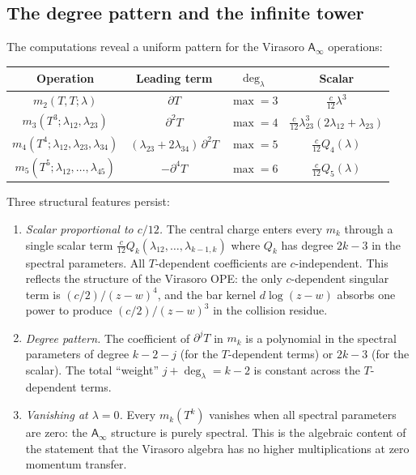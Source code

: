 \documentclass[11pt]{article}
\newcommand{\Ainf}{\mathsf{A}_{\infty}}
\begin{document}
\subsection{The degree pattern and the infinite tower}

The computations reveal a uniform pattern for the Virasoro
$\Ainf$ operations:

\begin{center}
\small
\renewcommand{\arraystretch}{1.3}
\begin{tabular}{@{}cccc@{}}
\textbf{Operation}
  & \textbf{Leading term}
  & \textbf{$\deg_\lambda$}
  & \textbf{Scalar} \\
\hline
$m_2(T,T;\lambda)$
  & $\partial T$
  & $\max = 3$
  & $\frac{c}{12}\lambda^3$ \\[3pt]
$m_3(T^3;\lambda_{12},\lambda_{23})$
  & $\partial^2 T$
  & $\max = 4$
  & $\frac{c}{12}\lambda_{23}^3(2\lambda_{12}+\lambda_{23})$ \\[3pt]
$m_4(T^4;\lambda_{12},\lambda_{23},\lambda_{34})$
  & $(\lambda_{23}+2\lambda_{34})\,\partial^2 T$
  & $\max = 5$
  & $\frac{c}{12}Q_4(\lambda)$ \\[3pt]
$m_5(T^5;\lambda_{12},\ldots,\lambda_{45})$
  & $-\partial^4 T$
  & $\max = 6$
  & $\frac{c}{12}Q_5(\lambda)$
\end{tabular}
\end{center}

\medskip

\noindent
Three structural features persist:

\begin{enumerate}[label=\textup{(\alph*)},nosep]
\item \textit{Scalar proportional to $c/12$.}  The central charge
  enters every $m_k$ through a single scalar term
  $\frac{c}{12}Q_k(\lambda_{12}, \ldots, \lambda_{k-1,k})$ where
  $Q_k$ has degree $2k - 3$ in the spectral parameters.  All
  $T$-dependent coefficients are $c$-independent.  This reflects the
  structure of the Virasoro OPE: the only $c$-dependent singular term
  is $(c/2)/(z-w)^4$, and the bar kernel $d\log(z-w)$ absorbs one
  power to produce $(c/2)/(z-w)^3$ in the collision residue.

\item \textit{Degree pattern.}  The coefficient of $\partial^j T$ in
  $m_k$ is a polynomial in the spectral parameters of degree $k - 2 - j$
  (for the $T$-dependent terms) or $2k - 3$ (for the scalar).  The
  total ``weight'' $j + \deg_\lambda = k - 2$ is constant across the
  $T$-dependent terms.

\item \textit{Vanishing at $\lambda = 0$.}  Every $m_k(T^k)$ vanishes
  when all spectral parameters are zero: the $\Ainf$ structure is
  purely spectral.  This is the algebraic content of the statement that
  the Virasoro algebra has no higher multiplications at zero momentum
  transfer.
\end{enumerate}
\end{document}
